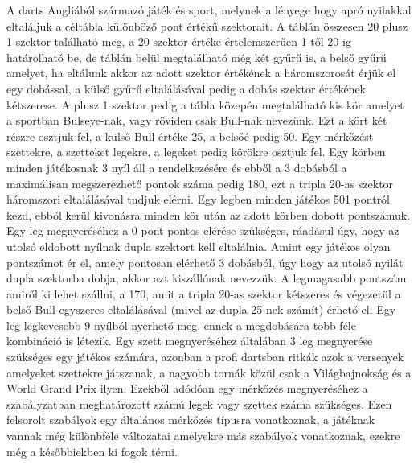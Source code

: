 

A darts Angliából származó játék és sport, melynek a lényege hogy apró nyilakkal eltaláljuk a céltábla különböző pont értékű szektorait. A táblán összesen 20 plusz 1 szektor található meg, a 20 szektor értéke értelemszerűen 1-től 20-ig határolható be, de táblán belül megtalálható még két gyűrű is, a belső gyűrű amelyet, ha eltálunk akkor az adott szektor értékének a háromszorosát érjük el egy dobással, a külső gyűrű eltalálásával pedig a dobás szektor értékének kétszerese. A plusz 1 szektor pedig a tábla közepén megtalálható kis kör amelyet a sportban Bulseye-nak, vagy röviden csak Bull-nak nevezünk. Ezt a kört két részre osztjuk fel, a külső Bull értéke 25, a belsőé pedig 50. 
Egy mérkőzést szettekre, a szetteket legekre, a legeket pedig körökre osztjuk fel. Egy körben minden játékosnak 3 nyíl áll a rendelkezésére és ebből a 3 dobásból a maximálisan megszerezhető pontok száma pedig 180, ezt a tripla 20-as szektor háromszori eltalálásával tudjuk elérni. Egy legben minden játékos 501 pontról kezd, ebből kerül kivonásra minden kör után az adott körben dobott pontszámuk. Egy leg megnyeréséhez a 0 pont pontos elérése szükséges, ráadásul úgy, hogy az utolsó eldobott nyílnak dupla szektort kell eltalálnia. Amint egy játékos olyan pontszámot ér el, amely pontosan elérhető 3 dobásból, úgy hogy az utolsó nyilát dupla szektorba dobja, akkor azt kiszállónak nevezzük. A legmagasabb pontszám amiről ki lehet szállni, a 170, amit a tripla 20-as szektor kétszeres és végezetül a belső Bull egyszeres eltalálásával (mivel az dupla 25-nek számít) érhető el. Egy leg legkevesebb 9 nyílból nyerhető meg, ennek a megdobására több féle kombináció is létezik. Egy szett megnyeréséhez általában 3 leg megnyerése szükséges egy játékos számára, azonban a profi dartsban ritkák azok a versenyek amelyeket szettekre játszanak, a nagyobb tornák közül csak a Világbajnokság és a World Grand Prix ilyen. Ezekből adódóan egy mérkőzés megnyeréséhez a szabályzatban meghatározott számú legek vagy szettek száma szükséges. Ezen felsorolt szabályok egy általános mérkőzés típusra vonatkoznak, a játéknak vannak még különbféle változatai amelyekre más szabályok vonatkoznak, ezekre még a későbbiekben ki fogok térni.



